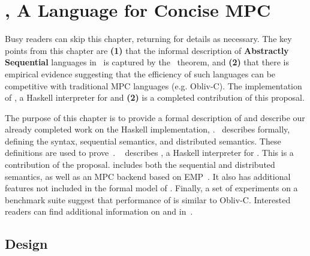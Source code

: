 \chapter{\mpc, A Language for Concise MPC}
\label{ch:mpc}

 

Busy readers can skip this chapter, returning for details as necessary. The key points from this chapter are
\textbf{(1)} that the informal description of \textbf{Abstractly Sequential} languages in~ is captured
by the~ theorem, and \textbf{(2)} that there is empirical evidence suggesting that
the efficiency of such languages can be competitive with traditional MPC languages (e.g. Obliv-C). The implementation
of \system, a Haskell interpreter for \mpc and \textbf{(2)} is a completed contribution of this proposal.

The purpose of this chapter is to provide a formal description of \mpc and describe our already completed work
on the Haskell implementation, \system.~ describes \mpc formally, defining the syntax,
sequential semantics, and distributed semantics. These definitions are used to prove~.
~ describes \system, a Haskell interpreter for \mpc. This is a contribution of the proposal.
\system includes both the sequential and distributed semantics, as well as an MPC backend based on EMP~\cite{}.
It also has additional features not included in the formal model of \mpc. Finally, a set of experiments on a
benchmark suite suggest that performance of \system is similar to Obliv-C. Interested readers can find additional
information on \mpc and \system in~\citet{todo}.

\section{Design}
\label{sec:mpc-design}

